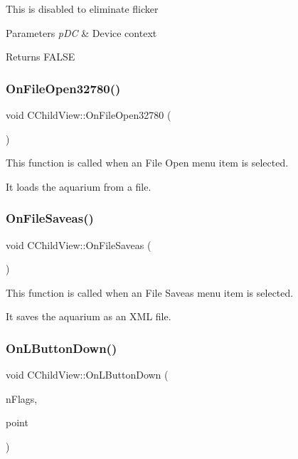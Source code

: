This is disabled to eliminate flicker 
\begin{DoxyParams}{Parameters}
{\em p\+DC} & Device context \\
\hline
\end{DoxyParams}
\begin{DoxyReturn}{Returns}
F\+A\+L\+SE 
\end{DoxyReturn}
\mbox{\label{class_c_child_view_a6e69d915eea1631da5f8a8d8d5a2c101}} 
\subsubsection{\texorpdfstring{On\+File\+Open32780()}{OnFileOpen32780()}}
{\footnotesize\ttfamily void C\+Child\+View\+::\+On\+File\+Open32780 (\begin{DoxyParamCaption}{ }\end{DoxyParamCaption})}

This function is called when an File Open menu item is selected.

It loads the aquarium from a file. \mbox{\label{class_c_child_view_a2f79325c40f3a93227e60498b2135785}} 
\subsubsection{\texorpdfstring{On\+File\+Saveas()}{OnFileSaveas()}}
{\footnotesize\ttfamily void C\+Child\+View\+::\+On\+File\+Saveas (\begin{DoxyParamCaption}{ }\end{DoxyParamCaption})}

This function is called when an File Saveas menu item is selected.

It saves the aquarium as an X\+ML file. \mbox{\label{class_c_child_view_af513a57c45ce8b9dcc09dd934e228534}} 
\subsubsection{\texorpdfstring{On\+L\+Button\+Down()}{OnLButtonDown()}}
{\footnotesize\ttfamily void C\+Child\+View\+::\+On\+L\+Button\+Down (\begin{DoxyParamCaption}\item[{U\+I\+NT}]{n\+Flags,  }\item[{C\+Point}]{point }\end{DoxyParamCaption})}

